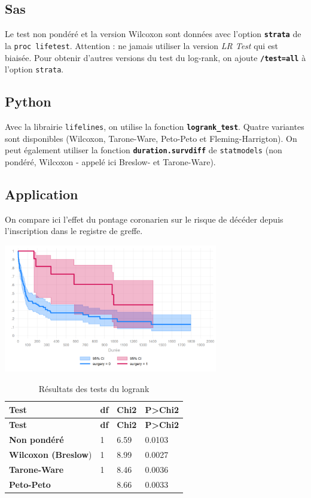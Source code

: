 \documentclass[
  12pt,
  letterpaper,
  DIV=11,
  numbers=noendperiod,
  onepage,
  openany]{scrreprt}
\begin{document}
\subsection{Sas}

Le test non pondéré et la version Wilcoxon sont données avec l'option
\textbf{\texttt{strata}} de la \texttt{proc\ lifetest}. Attention : ne
jamais utiliser la version \emph{LR Test} qui est biaisée. Pour obtenir
d'autres versions du test du log-rank, on ajoute
\textbf{\texttt{/test=all}} à l'option \texttt{strata}.

\subsection{Python}

Avec la librairie \texttt{lifelines}, on utilise la fonction
\textbf{\texttt{logrank\_test}}. Quatre variantes sont disponibles
(Wilcoxon, Tarone-Ware, Peto-Peto et Fleming-Harrigton). On peut
également utiliser la fonction \textbf{\texttt{duration.survdiff}} de
\texttt{statmodels} (non pondéré, Wilcoxon - appelé ici Breslow- et
Tarone-Ware).

\hypertarget{application-2}{%
\subsection{Application}\label{application-2}}

On compare ici l'effet du pontage coronarien sur le risque de décéder
depuis l'inscription dans le registre de greffe.

\includegraphics[width=0.7\textwidth,height=\textheight]{images/Image9.png}

\begin{longtable}[]{@{}llll@{}}
\caption{Résultats des tests du logrank}\tabularnewline
\toprule\noalign{}
\textbf{Test} & \textbf{df} & \textbf{Chi2} &
\textbf{P\textgreater Chi2} \\
\midrule\noalign{}
\endfirsthead
\toprule\noalign{}
\textbf{Test} & \textbf{df} & \textbf{Chi2} &
\textbf{P\textgreater Chi2} \\
\midrule\noalign{}
\endhead
\bottomrule\noalign{}
\endlastfoot
\textbf{Non pondéré} & 1 & 6.59 & 0.0103 \\
\textbf{Wilcoxon (Breslow}) & 1 & 8.99 & 0.0027 \\
\textbf{Tarone-Ware} & 1 & 8.46 & 0.0036 \\
\textbf{Peto-Peto} & & 8.66 & 0.0033 \\
\end{longtable}
\end{document}
